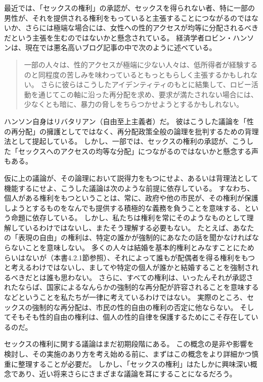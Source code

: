 \documentclass[paper=a4,book,openany]{jlreq}
\begin{document}
最近では、「セックスの権利」の承認が、セックスを得られない者、特に一部の男性が、それを提供される権利をもっていると主張することにつながるのではないか、さらには極端な場合には、女性への性的アクセスが均等に分配されるべきだという主張を生むのではないかと懸念されている。
経済学者ロビン・ハンソンは、現在では悪名高いブログ記事の中で次のように述べている。

\begin{quote}
一部の人々は、性的アクセスが極端に少ない人々は、低所得者が経験するのと同程度の苦しみを味わっているともっともらしく主張するかもしれない。
さらに彼らはこうしたアイデンティティのもとに結集して、ロビー活動を通じてこの軸に沿った再分配を求め、要求が満たされない場合には、少なくとも暗に、暴力の脅しをちらつかせようとするかもしれない。
\citep{hanson18:_two_types_envy}
\end{quote}

ハンソン自身はリバタリアン（自由至上主義者）だ。
彼はこうした議論を「性の再分配」の擁護としてではなく、再分配政策全般の論理を批判するための背理法として提起している。
しかし、一部では、セックスの権利の承認が、こうした「セックスへのアクセスの均等な分配」につながるのではないかと懸念する声もある。

仮に上の議論が、その論理において説得力をもつにせよ、あるいは背理法として機能するにせよ、こうした議論は次のような前提に依存している。
すなわち、個人がある権利をもつということは、常に、政府や他の市民が、その権利が保護しようとするものをなんでも提供する積極的な義務を負うことを意味する、という命題に依存している。
しかし、私たちは権利を常にそのようなものとして理解しているわけではないし、またそう理解する必要もない。
たとえば、あなたの「表現の自由」の権利は、特定の誰かが強制的にあなたの話を聞かなければならないことを意味しない。
多くの人々は結婚を基本的権利とみなすことにためらいはないが（本書4.2.1節参照）、それによって誰もが配偶者を得る権利をもつと考えるわけではないし、ましてや特定の個人が誰かと結婚することを強制されるべきだとは誰も思わない。
さらに、すべての権利は、いったんそれが承認されたならば、国家によるなんらかの強制的な再分配が許容されることを意味するなどということを私たちが一律に考えているわけではない。
実際のところ、セックスの強制的な再分配は、市民の性的自由の権利の否定に他ならない。
そしてそもそも性的自由の権利は、個人の性的自律を保護するためにこそ存在しているのだ。

セックスの権利に関する議論はまだ初期段階にある。
この概念の是非や影響を検討し、その実施のあり方を考え始める前に、まずはこの概念をより詳細かつ慎重に整理することが必要だ。
しかし、「セックスの権利」はたしかに興味深い概念であり、近い将来さらにさまざまな議論を耳にすることになるだろう。
\end{document}

